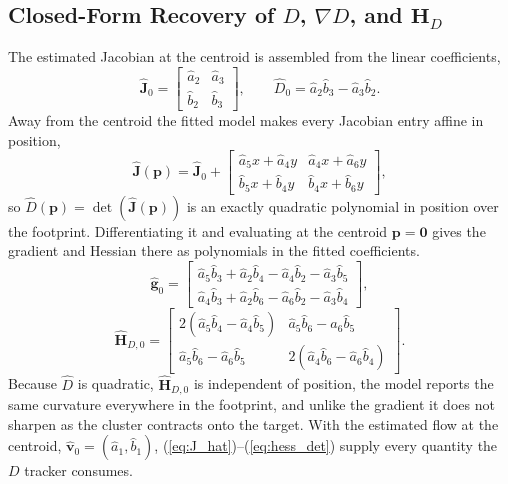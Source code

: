 \documentclass[lettersize,journal]{IEEEtran}
\begin{document}
\subsection{Closed-Form Recovery of $D$, $\nabla D$, and $\mathbf{H}_D$}

The estimated Jacobian at the centroid is assembled from the linear
coefficients,
\begin{equation}
    \hat{\mathbf{J}}_0 =
    \begin{bmatrix}
        \hat{a}_2 & \hat{a}_3 \\ \hat{b}_2 & \hat{b}_3
    \end{bmatrix},
    \qquad
    \hat{D}_0 = \hat{a}_2 \hat{b}_3 - \hat{a}_3 \hat{b}_2.
    \label{eq:J_hat}
\end{equation}
Away from the centroid the fitted model makes every Jacobian entry affine
in position,
\begin{equation}
    \hat{\mathbf{J}}(\mathbf{p}) = \hat{\mathbf{J}}_0 +
    \begin{bmatrix}
        \hat{a}_5 x + \hat{a}_4 y &
        \hat{a}_4 x + \hat{a}_6 y \\
        \hat{b}_5 x + \hat{b}_4 y &
        \hat{b}_4 x + \hat{b}_6 y
    \end{bmatrix},
\end{equation}
so $\hat{D}(\mathbf{p}) = \det(\hat{\mathbf{J}}(\mathbf{p}))$ is an exactly
quadratic polynomial in position over the footprint. Differentiating
it and evaluating at the centroid $\mathbf{p} = \mathbf{0}$ gives the
gradient and Hessian there as polynomials in the fitted coefficients.
\begin{equation}
    \hat{\mathbf{g}}_0 =
    \begin{bmatrix}
        \hat{a}_5 \hat{b}_3 + \hat{a}_2 \hat{b}_4
            - \hat{a}_4 \hat{b}_2 - \hat{a}_3 \hat{b}_5 \\
        \hat{a}_4 \hat{b}_3 + \hat{a}_2 \hat{b}_6
            - \hat{a}_6 \hat{b}_2 - \hat{a}_3 \hat{b}_4
    \end{bmatrix},
    \label{eq:grad_det}
\end{equation}
\begin{equation}
    \hat{\mathbf{H}}_{D,0} =
    \begin{bmatrix}
        2(\hat{a}_5 \hat{b}_4 - \hat{a}_4 \hat{b}_5) &
        \hat{a}_5 \hat{b}_6 - \hat{a}_6 \hat{b}_5 \\
        \hat{a}_5 \hat{b}_6 - \hat{a}_6 \hat{b}_5 &
        2(\hat{a}_4 \hat{b}_6 - \hat{a}_6 \hat{b}_4)
    \end{bmatrix}.
    \label{eq:hess_det}
\end{equation}
Because $\hat{D}$ is quadratic, $\hat{\mathbf{H}}_{D,0}$ is independent of
position, the model reports the same curvature everywhere in the
footprint, and unlike the gradient it does not sharpen as the cluster
contracts onto the target. With the estimated flow at the centroid,
$\hat{\mathbf{v}}_0 = (\hat{a}_1, \hat{b}_1)$,
(\ref{eq:J_hat})--(\ref{eq:hess_det}) supply every quantity the $D$
tracker consumes.
\end{document}
